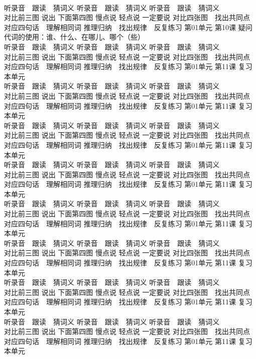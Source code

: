 \documentclass[8pt]{extreport}
\begin{document}
\begin{CJK}{UTF8}{min}
\\	听录音　跟读　猜词义 听录音　跟读　猜词义 听录音　跟读　猜词义 
\\	对比前三图 说出 下面第四图 慢点说 轻点说 一定要说	对比四张图　找出共同点 对应四句话　理解相同词 推理归纳　找出规律　反复练习 第01单元 第10课 疑问代词的使用：谁、什么、在哪儿、哪个（些）
\\	听录音　跟读　猜词义 听录音　跟读　猜词义 听录音　跟读　猜词义 
\\	对比前三图 说出 下面第四图 慢点说 轻点说 一定要说	对比四张图　找出共同点 对应四句话　理解相同词 推理归纳　找出规律　反复练习 第01单元 第11课 复习本单元
\\	听录音　跟读　猜词义 听录音　跟读　猜词义 听录音　跟读　猜词义 
\\	对比前三图 说出 下面第四图 慢点说 轻点说 一定要说	对比四张图　找出共同点 对应四句话　理解相同词 推理归纳　找出规律　反复练习 第01单元 第11课 复习本单元
\\	听录音　跟读　猜词义 听录音　跟读　猜词义 听录音　跟读　猜词义 
\\	对比前三图 说出 下面第四图 慢点说 轻点说 一定要说	对比四张图　找出共同点 对应四句话　理解相同词 推理归纳　找出规律　反复练习 第01单元 第11课 复习本单元
\\	听录音　跟读　猜词义 听录音　跟读　猜词义 听录音　跟读　猜词义 
\\	对比前三图 说出 下面第四图 慢点说 轻点说 一定要说	对比四张图　找出共同点 对应四句话　理解相同词 推理归纳　找出规律　反复练习 第01单元 第11课 复习本单元
\\	听录音　跟读　猜词义 听录音　跟读　猜词义 听录音　跟读　猜词义 
\\	对比前三图 说出 下面第四图 慢点说 轻点说 一定要说	对比四张图　找出共同点 对应四句话　理解相同词 推理归纳　找出规律　反复练习 第01单元 第11课 复习本单元
\\	听录音　跟读　猜词义 听录音　跟读　猜词义 听录音　跟读　猜词义 
\\	对比前三图 说出 下面第四图 慢点说 轻点说 一定要说	对比四张图　找出共同点 对应四句话　理解相同词 推理归纳　找出规律　反复练习 第01单元 第11课 复习本单元
\\	听录音　跟读　猜词义 听录音　跟读　猜词义 听录音　跟读　猜词义 
\\	对比前三图 说出 下面第四图 慢点说 轻点说 一定要说	对比四张图　找出共同点 对应四句话　理解相同词 推理归纳　找出规律　反复练习 第01单元 第11课 复习本单元
\\	听录音　跟读　猜词义 听录音　跟读　猜词义 听录音　跟读　猜词义 
\\	对比前三图 说出 下面第四图 慢点说 轻点说 一定要说	对比四张图　找出共同点 对应四句话　理解相同词 推理归纳　找出规律　反复练习 第01单元 第11课 复习本单元

\end{CJK}
\end{document}
